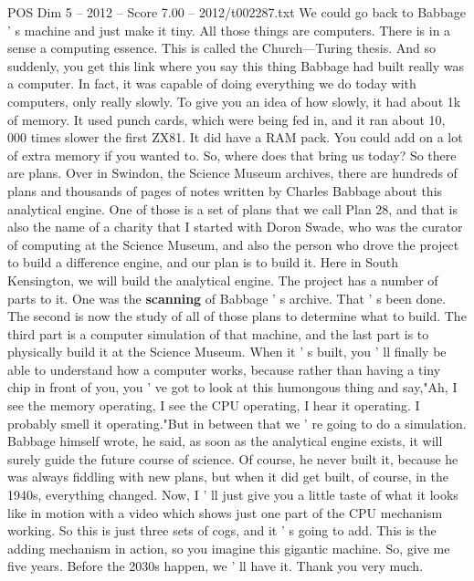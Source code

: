 \begin{textsample}{POS Dim 5 – 2012 – Score 7.00 – 2012/t002287.txt}
We could go back to Babbage ' s machine and just make it tiny.
All those things are computers.
There is in a sense a computing essence.
This is called the Church—Turing thesis.
And so suddenly, you get this link where you say this thing Babbage had built really was a computer.
In fact, it was capable of doing everything we do today with computers, only really slowly.
To give you an idea of how slowly, it had about 1k of memory.
It used punch cards, which were being fed in, and it ran about 10, 000 times slower the first ZX81.
It did have a RAM pack.
You could add on a lot of extra memory if you wanted to.
So, where does that bring us today?
So there are plans.
Over in Swindon, the Science Museum archives, there are hundreds of plans and thousands of pages of notes written by Charles Babbage about this analytical engine.
One of those is a set of plans that we call Plan 28, and that is also the name of a charity that I started with Doron Swade, who was the curator of computing at the Science Museum, and also the person who drove the project to build a difference engine, and our plan is to build it.
Here in South Kensington, we will build the analytical engine.
The project has a number of parts to it.
One was the \textbf{scanning} of Babbage ' s archive.
That ' s been done.
The second is now the study of all of those plans to determine what to build.
The third part is a computer simulation of that machine, and the last part is to physically build it at the Science Museum.
When it ' s built, you ' ll finally be able to understand how a computer works, because rather than having a tiny chip in front of you, you ' ve got to look at this humongous thing and say,"Ah, I see the memory operating, I see the CPU operating, I hear it operating.
I probably smell it operating."But in between that we ' re going to do a simulation.
Babbage himself wrote, he said, as soon as the analytical engine exists, it will surely guide the future course of science.
Of course, he never built it, because he was always fiddling with new plans, but when it did get built, of course, in the 1940s, everything changed.
Now, I ' ll just give you a little taste of what it looks like in motion with a video which shows just one part of the CPU mechanism working.
So this is just three sets of cogs, and it ' s going to add.
This is the adding mechanism in action, so you imagine this gigantic machine.
So, give me five years.
Before the 2030s happen, we ' ll have it.
Thank you very much.

\end{textsample}
